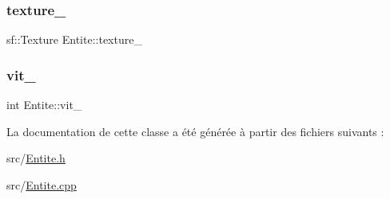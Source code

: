 \mbox{\label{class_entite_a8147b9459318a9b1de1b72dce115680a}} 
\subsubsection{\texorpdfstring{texture\+\_\+}{texture\_}}
{\footnotesize\ttfamily sf\+::\+Texture Entite\+::texture\+\_\+\hspace{0.3cm}{\ttfamily [protected]}}

\mbox{\label{class_entite_a62c3145096f707457d60306ea6729ed6}} 
\subsubsection{\texorpdfstring{vit\+\_\+}{vit\_}}
{\footnotesize\ttfamily int Entite\+::vit\+\_\+\hspace{0.3cm}{\ttfamily [protected]}}



La documentation de cette classe a été générée à partir des fichiers suivants \+:\begin{DoxyCompactItemize}
\item 
src/\hyperlink{_entite_8h}{Entite.\+h}\item 
src/\hyperlink{_entite_8cpp}{Entite.\+cpp}\end{DoxyCompactItemize}
